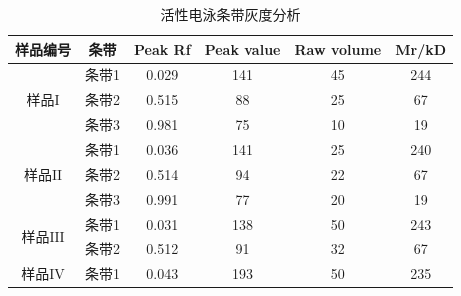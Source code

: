 \begin{table}[]
\centering
\caption{活性电泳条带灰度分析}
\label{tab:Actibity_Electro}
\begin{tabular}{@{}cccccc@{}}
\toprule
样品编号                 & 条带  & Peak Rf & Peak value & Raw volume & Mr/kD \\ \midrule
\multirow{3}{*}{样品$\mathrm{I}$} & 条带1 & 0.029   & 141        & 45         & 244   \\
                     & 条带2 & 0.515   & 88         & 25         & 67    \\
                     & 条带3 & 0.981   & 75         & 10         & 19    \\ \midrule
\multirow{3}{*}{样品$\mathrm{II}$} & 条带1 & 0.036   & 141        & 25         & 240   \\
                     & 条带2 & 0.514   & 94         & 22         & 67    \\
                     & 条带3 & 0.991   & 77         & 20         & 19    \\ \midrule
\multirow{2}{*}{样品$\mathrm{III}$} & 条带1 & 0.031   & 138        & 50         & 243   \\
                     & 条带2 & 0.512   & 91         & 32         & 67    \\ \midrule
样品$\mathrm{IV}$                  & 条带1 & 0.043   & 193        & 50         & 235   \\ \bottomrule
\end{tabular}
\end{table}

